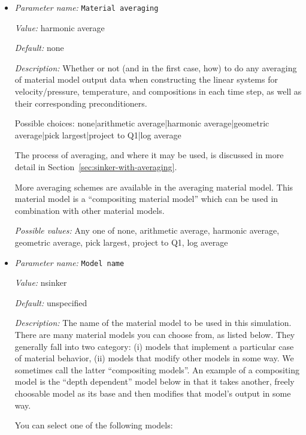 \begin{itemize}
\item {\it Parameter name:} {\tt Material averaging}
\label{parameters:Material model/Material averaging}
\label{parameters:Material_20model/Material_20averaging}


{\it Value:} harmonic average


{\it Default:} none


{\it Description:} Whether or not (and in the first case, how) to do any averaging of material model output data when constructing the linear systems for velocity/pressure, temperature, and compositions in each time step, as well as their corresponding preconditioners.

Possible choices: none|arithmetic average|harmonic average|geometric average|pick largest|project to Q1|log average

The process of averaging, and where it may be used, is discussed in more detail in Section~\ref{sec:sinker-with-averaging}.

More averaging schemes are available in the averaging material model. This material model is a ``compositing material model'' which can be used in combination with other material models.


{\it Possible values:} Any one of none, arithmetic average, harmonic average, geometric average, pick largest, project to Q1, log average
\item {\it Parameter name:} {\tt Model name}
\label{parameters:Material model/Model name}
\label{parameters:Material_20model/Model_20name}


{\it Value:} nsinker


{\it Default:} unspecified


{\it Description:} The name of the material model to be used in this simulation. There are many material models you can choose from, as listed below. They generally fall into two category: (i) models that implement a particular case of material behavior, (ii) models that modify other models in some way. We sometimes call the latter ``compositing models''. An example of a compositing model is the ``depth dependent'' model below in that it takes another, freely choosable model as its base and then modifies that model's output in some way.

You can select one of the following models:


\end{itemize}

